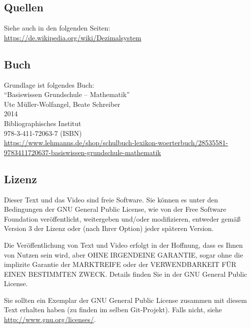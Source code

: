 \documentclass[a4paper]{amsart}
\theoremstyle{definition}
\begin{document}
\subsection*{Quellen}
Siehe auch in den folgenden Seiten:\\
\url{https://de.wikipedia.org/wiki/Dezimalsystem}

\subsection*{Buch}
Grundlage ist folgendes Buch:\\
"`Basiswissen Grundschule – Mathematik"'\\
Ute Müller-Wolfangel, Beate Schreiber\\
2014\\
Bibliographisches Institut\\
978-3-411-72063-7 (ISBN)
\\
{\tiny\url{https://www.lehmanns.de/shop/schulbuch-lexikon-woerterbuch/28535581-9783411720637-basiswissen-grundschule-mathematik}}

\subsection*{Lizenz}
Dieser Text und das Video sind freie Software. Sie können es unter den Bedingungen der
GNU General Public License, wie von der Free Software Foundation veröffentlicht, weitergeben
und/oder modifizieren, entweder gemäß Version 3 der Lizenz oder (nach Ihrer Option) jeder späteren Version.

Die Veröffentlichung von Text und Video erfolgt in der Hoffnung, dass es Ihnen von Nutzen sein wird,
aber OHNE IRGENDEINE GARANTIE, sogar ohne die implizite Garantie der MARKTREIFE oder der
VERWENDBARKEIT FÜR EINEN BESTIMMTEN ZWECK. Details finden Sie in der GNU General Public License.

Sie sollten ein Exemplar der GNU General Public License zusammen mit diesem Text erhalten haben
(zu finden im selben Git-Projekt).
Falls nicht, siehe \url{http://www.gnu.org/licenses/}.
\end{document}
